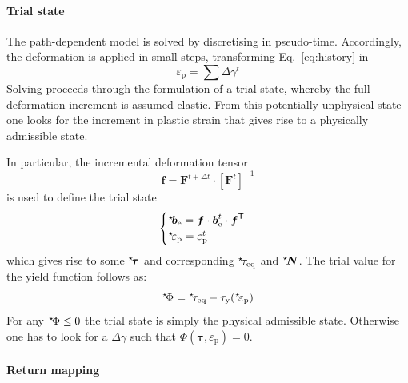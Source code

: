 \documentclass[garamond]{goose-article}
\newcommand\ST[1]{\hspace*{-.3em}~^\star\!#1}
\newcommand\T[1]{\bm{{#1}}}
\begin{document}
\paragraph{Trial state}

The path-dependent model is solved by discretising in pseudo-time. Accordingly, the deformation is applied in small steps, transforming Eq.~\eqref{eq:history} in
\begin{equation}
  \varepsilon_\mathrm{p} = \sum \Delta \gamma^t
\end{equation}
Solving proceeds through the formulation of a trial state, whereby the full deformation increment is assumed elastic. From this potentially unphysical state one looks for the increment in plastic strain that gives rise to a physically admissible state.

In particular, the incremental deformation tensor
\begin{equation}
  \T{f} = \T{F}^{t + \Delta t} \cdot \left[ \T{F}^t \right]^{-1}
\end{equation}
is used to define the trial state
\begin{equation}
  \begin{cases}
    \ST{\T{b}}_\mathrm{e} = \T{f} \cdot \T{b}_\mathrm{e}^t \cdot \T{f}^\mathsf{T}
    \\
    \ST{\varepsilon_\mathrm{p}} = \varepsilon_\mathrm{p}^t
  \end{cases}
\end{equation}
which gives rise to some $\ST{\T{\tau}}$ and corresponding $\ST{\tau}_\mathrm{eq}$ and $\ST{\T{N}}$. The trial value for the yield function follows as:
\begin{equation}
  \ST{\Phi} = \ST{\tau}_\mathrm{eq} - \tau_\mathrm{y}(\ST{\varepsilon}_\mathrm{p})
\end{equation}
For any $\ST{\Phi} \leq 0$ the trial state is simply the physical admissible state. Otherwise one has to look for a $\Delta \gamma$ such that $\Phi(\T{\tau},\varepsilon_\mathrm{p}) = 0$.

\paragraph{Return mapping}
\end{document}
